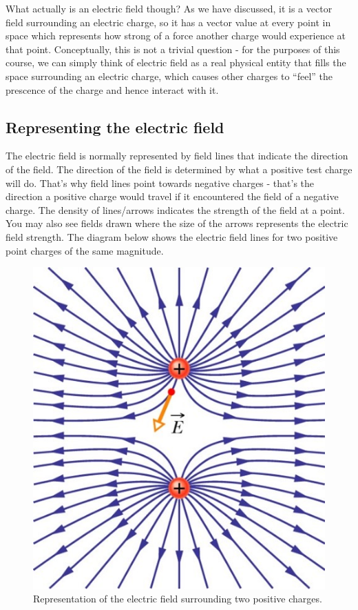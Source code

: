 \documentclass[
  letterpaper,
  DIV=11,
  numbers=noendperiod]{scrreprt}
\begin{document}
What actually is an electric field though? As we have discussed, it is a
vector field surrounding an electric charge, so it has a vector value at
every point in space which represents how strong of a force another
charge would experience at that point. Conceptually, this is not a
trivial question - for the purposes of this course, we can simply think
of electric field as a real physical entity that fills the space
surrounding an electric charge, which causes other charges to ``feel''
the prescence of the charge and hence interact with it.

\subsection{Representing the electric
field}\label{representing-the-electric-field}

The electric field is normally represented by field lines that indicate
the direction of the field. The direction of the field is determined by
what a positive test charge will do. That's why field lines point
towards negative charges - that's the direction a positive charge would
travel if it encountered the field of a negative charge. The density of
lines/arrows indicates the strength of the field at a point. You may
also see fields drawn where the size of the arrows represents the
electric field strength. The diagram below shows the electric field
lines for two positive point charges of the same magnitude.

\begin{figure}[H]

{\centering \includegraphics{Figures/Efield_like.png}

}

\caption{Representation of the electric field surrounding two positive
charges.}

\end{figure}%
\end{document}
